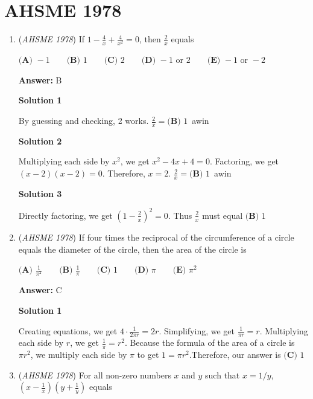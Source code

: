 \section{AHSME 1978}
        \begin{enumerate}
        	\item (\textit{AHSME 1978}) If $1-\frac{4}{x}+\frac{4}{x^2}=0$, then $\frac{2}{x}$ equals


 $\textbf{(A) }-1\qquad \textbf{(B) }1\qquad \textbf{(C) }2\qquad \textbf{(D) }-1\text{ or }2\qquad  \textbf{(E) }-1\text{ or }-2$

 \textbf{Answer: }B



\textbf{Solution 1}

By guessing and checking, 2 works. $\frac{2}{x} = \boxed{\textbf{(B)  }1}$~awin

 



\textbf{Solution 2}

Multiplying each side by $x^2$, we get $x^2-4x+4 = 0$. Factoring, we get $(x-2)(x-2) = 0$. Therefore, $x = 2$. $\frac{2}{x} = \boxed{\textbf{(B)  }1}$~awin

 



\textbf{Solution 3}

Directly factoring, we get $(1-\frac{2}{x})^2 = 0$. Thus $\frac{2}{x}$ must equal $\boxed{\textbf{(B)  }1}$



	\item (\textit{AHSME 1978}) If four times the reciprocal of the circumference of a circle equals the diameter of the circle, then the area of the circle is 


 $\textbf{(A) }\frac{1}{\pi^2}\qquad \textbf{(B) }\frac{1}{\pi}\qquad \textbf{(C) }1\qquad \textbf{(D) }\pi\qquad \textbf{(E) }\pi^2$

 \textbf{Answer: }C



\textbf{Solution 1}

Creating equations, we get $4\cdot\frac{1}{2\pi r} = 2r$. Simplifying, we get $\frac{1}{\pi r} = r$. Multiplying each side by $r$, we get $\frac{1}{\pi} = r^2$. Because the formula of the area of a circle is $\pi r^2$, we multiply each side by $\pi$ to get $1 = \pi r^2$.Therefore, our answer is $\boxed{\textbf{(C)  }1}$



	\item (\textit{AHSME 1978}) For all non-zero numbers $x$ and $y$ such that $x = 1/y$, $\left(x-\frac{1}{x}\right)\left(y+\frac{1}{y}\right)$ equals



\end{enumerate}
